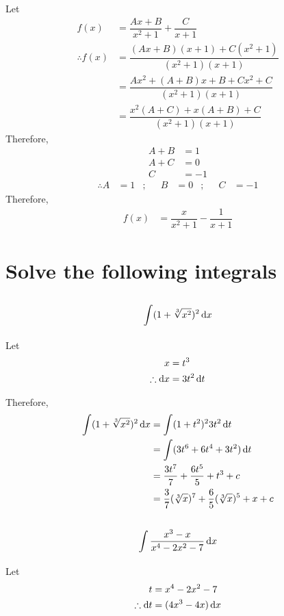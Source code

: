 \documentclass[fleqn, a4paper]{article}
\begin{document}
Let
\begin{align*}
	f(x) &= \dfrac{Ax + B}{x^2 + 1} + \dfrac{C}{x + 1}\\
	\therefore f(x) &= \dfrac{(Ax + B)(x + 1) + C(x^2 + 1)}{(x^2 + 1)(x + 1)}\\
	&= \dfrac{Ax^2 + (A + B)x + B + Cx^2 + C}{(x^2 + 1)(x + 1)}\\
	&= \dfrac{x^2 (A + C) + x(A + B) + C}{(x^2 + 1)(x + 1)}
\end{align*}
Therefore,
\begin{align*}
	A + B &= 1\\
	A + C &= 0\\
	C &= -1
\end{align*}
\begin{align*}
	\therefore A &= 1 &;& & B &= 0 &;& & C &= -1
\end{align*}
Therefore,
\begin{align*}
	f(x) &= \dfrac{x}{x^2 + 1} - \dfrac{1}{x + 1}
\end{align*}

\section{Solve the following integrals}

\subsection{\[\int (1 + \sqrt[3]{x^2})^2 \dif x\]}

Let
\begin{align*}
	x &= t^3\\
	\therefore \dif x &= 3t^2 \dif t
\end{align*}

Therefore,
\begin{align*}
	\int (1 + \sqrt[3]{x^2})^2 \dif x &= \int (1 + t^2)^2 3t^2 \dif t\\
	&= \int (3t^6 + 6t^4 + 3t^2) \dif t\\
	&= \dfrac{3t^7}{7} + \dfrac{6t^5}{5} + t^3 + c\\
	&= \dfrac{3}{7} (\sqrt[3]{x})^7 + \dfrac{6}{5} (\sqrt[3]{x})^5 + x + c
\end{align*}

\subsection{\[\int \dfrac{x^3 - x}{x^4 - 2x^2 - 7} \dif x\]}

Let
\begin{align*}
	t &= x^4 - 2x^2 - 7\\
	\therefore \dif t &= (4x^3 - 4x) \dif x
\end{align*}
\end{document}
